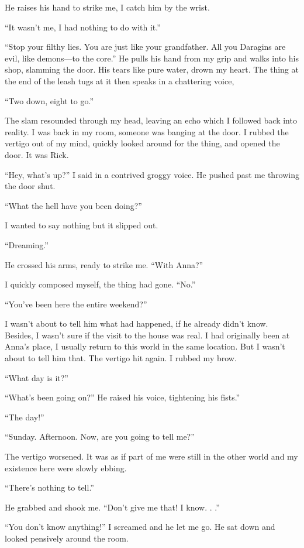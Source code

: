 \documentclass[
]{article}
\begin{document}
He raises his hand to strike me, I catch him by the wrist.

``It wasn't me, I had nothing to do with it.''

``Stop your filthy lies. You are just like your grandfather. All you
Daragins are evil, like demons---to the core.'' He pulls his hand from
my grip and walks into his shop, slamming the door. His tears like pure
water, drown my heart. The thing at the end of the leash tugs at it then
speaks in a chattering voice,

``Two down, eight to go.''

The slam resounded through my head, leaving an echo which I followed
back into reality. I was back in my room, someone was banging at the
door. I rubbed the vertigo out of my mind, quickly looked around for the
thing, and opened the door. It was Rick.

``Hey, what's up?'' I said in a contrived groggy voice. He pushed past
me throwing the door shut.

``What the hell have you been doing?''

I wanted to say nothing but it slipped out.

``Dreaming.''

He crossed his arms, ready to strike me. ``With Anna?''

I quickly composed myself, the thing had gone. ``No.''

``You've been here the entire weekend?''

I wasn't about to tell him what had happened, if he already didn't know.
Besides, I wasn't sure if the visit to the house was real. I had
originally been at Anna's place, I usually return to this world in the
same location. But I wasn't about to tell him that. The vertigo hit
again. I rubbed my brow.

``What day is it?''

``What's been going on?'' He raised his voice, tightening his fists.''

``The day!''

``Sunday. Afternoon. Now, are you going to tell me?''

The vertigo worsened. It was as if part of me were still in the other
world and my existence here were slowly ebbing.

``There's nothing to tell.''

He grabbed and shook me. ``Don't give me that! I know. . .''

``You don't know anything!'' I screamed and he let me go. He sat down
and looked pensively around the room.
\end{document}
